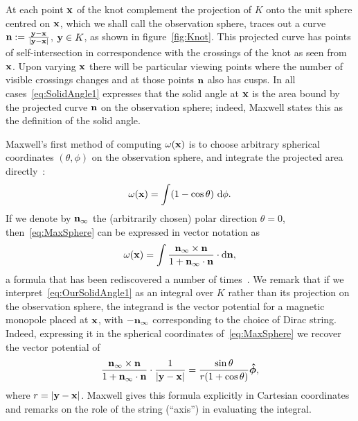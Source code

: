     At each point ${\bf x}$ of the knot complement the projection of $K$ onto the unit sphere centred on ${\bf x}$, which we shall call the observation sphere, traces out a curve ${\bf n}:=\frac{{\bf y}-{\bf x}}{|{\bf y}-{\bf x}|}$, ${\bf y}\in K$, as shown in figure~\ref{fig:Knot}. This projected curve has points of self-intersection in correspondence with the crossings of the knot as seen from ${\bf x}$. Upon varying ${\bf x}$ there will be particular viewing points where the number of visible crossings changes and at those points ${\bf n}$ also has cusps. In all cases~\eqref{eq:SolidAngle1} expresses that the solid angle at ${\bf x}$ is the area bound by the projected curve ${\bf n}$ on the observation sphere; indeed, Maxwell states this as the definition of the solid angle. 

    Maxwell's first method of computing $\omega({\bf x})$ is to choose arbitrary spherical coordinates $(\theta,\phi)$ on the observation sphere, and integrate the projected area directly~\citep[Art.~417]{Maxwell2}:
    \begin{equation}
        \omega({\bf x}) = \int (1 - \cos \theta)~\mathrm{d}\phi .
        \label{eq:MaxSphere}
    \end{equation}
    If we denote by ${\bf n}_{\infty}$ the (arbitrarily chosen) polar direction $\theta=0$, then~\eqref{eq:MaxSphere} can be expressed in vector notation as 
    \begin{equation}
        \omega({\bf x}) = \int \frac{{\bf n}_{\infty} \times {\bf n} }{1+{\bf n}_\infty \cdot {\bf n}} \cdot \mathrm{d}{\bf n} ,
        \label{eq:OurSolidAngle1}
    \end{equation}
    a formula that has been rediscovered a number of times~\citep{Asvestas1985,Dangskul2015,Borodzik2017}. We remark that if we interpret~\eqref{eq:OurSolidAngle1} as an integral over $K$ rather than its projection on the observation sphere, the integrand is the vector potential for a magnetic monopole placed at ${\bf x}$, with $-{\bf n}_{\infty}$ corresponding to the choice of Dirac string. Indeed, expressing it in the spherical coordinates of~\eqref{eq:MaxSphere} we recover the vector potential of~\citep{Dirac1931}
    \begin{equation}
        \frac{{\bf n}_{\infty} \times {\bf n} }{1+{\bf n}_\infty \cdot {\bf n}} \cdot \frac{1}{| \bf {y - x} |} = \frac{\sin{\theta}}{r(1+\cos{\theta})}\boldsymbol{\hat{\phi}}, 
    \end{equation}
    where $r = |{\bf y -x}|$. Maxwell gives this formula explicitly in Cartesian coordinates and remarks on the role of the string (``axis'') in evaluating the integral. 

